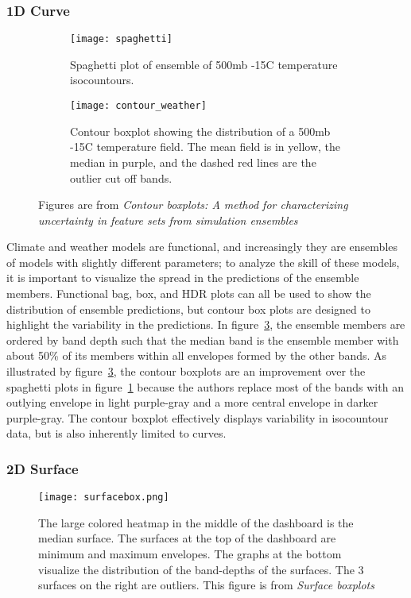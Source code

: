 \documentclass[../main.tex]{subfiles}
\begin{document}
\subsubsection{1D Curve}
\label{sec:curve}

\begin{figure}[H]
  \begin{subfigure}{\textwidth}
    \centering
    \texttt{[image: spaghetti]}
    \caption{Spaghetti plot of ensemble of 500mb -15C temperature isocountours.}
    \label{fig:spaghetti}
    \end{subfigure}

    \bigskip
    \begin{subfigure}{\textwidth}
    \centering
    \texttt{[image: contour\_weather]}
    \caption{Contour boxplot showing the distribution of a 500mb -15C temperature field. The mean field is in yellow, the median in purple, and the dashed red lines are the outlier cut off bands.}
    \label{fig:contour}
    \end{subfigure}

    \caption{Figures are from \textit{Contour boxplots: A method for characterizing uncertainty in feature sets from simulation ensembles} \cite{whitaker_contour_2013}}
\end{figure}

Climate and weather models are functional, and increasingly they are ensembles of models with slightly different parameters; to analyze the skill of these models, it is important to visualize the spread in the predictions of the ensemble members. Functional bag, box, and HDR plots \cite{rob_j._hyndman_rainbow_2010, sun_functional_2011} can all be used to show the distribution of ensemble predictions, but contour box plots \cite{whitaker_contour_2013} are designed to highlight the variability in the predictions. In figure~\ref{fig:contour}, the ensemble members are ordered by band depth such that the median band is the ensemble member with about 50\% of its members within all envelopes formed by the other bands. As illustrated by figure~\ref{fig:contour}, the contour boxplots are an improvement over the spaghetti  plots \cite{luo_visualizing_2003, whitaker_contour_2013} in figure~\ref{fig:spaghetti} because the authors replace most of the bands with an outlying envelope in light purple-gray and a more central envelope in darker purple-gray. The contour boxplot effectively displays variability in isocountour data, but is also inherently limited to curves.

\subsubsection{2D Surface}
\label{sec:surface}
\begin{figure}[H]
  \texttt{[image: surfacebox.png]}
  \caption{The large colored heatmap in the middle of the dashboard is the median surface. The surfaces at the top of the dashboard are minimum and maximum envelopes. The graphs at the bottom visualize the distribution of the band-depths of the surfaces. The 3 surfaces on the right are outliers. This figure is from \textit{Surface boxplots} \cite{genton_surface_2014}}
  \label{fig:surface}
\end{figure}
\end{document}
